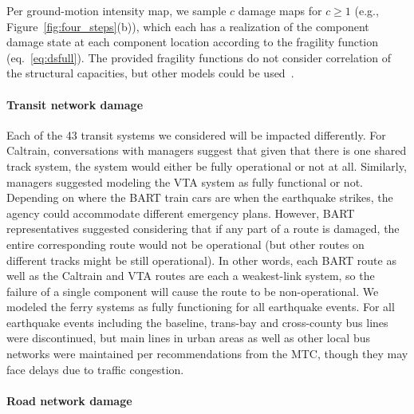 %

Per ground-motion intensity map, we sample $c$ damage maps for $c \geq 1$ (e.g., Figure~\ref{fig:four_steps}{(b)}), which each has a realization of the component damage state at each component location according to the fragility function (eq.~\ref{eq:dsfull}). The provided fragility functions do not consider correlation of the structural capacities, but other models could be used~\cite[e.g.,][]{baker_introducing_2008}.

\paragraph{Transit network damage}
\label{sec:transitDamage}
Each of the 43 transit systems we considered will be impacted differently. For Caltrain, conversations with managers suggest that given that there is one shared track system, the system would either be fully operational or  not at all. Similarly, managers suggested modeling the VTA system as fully functional or not. Depending on where the BART train cars are when the earthquake strikes, the agency could accommodate different emergency plans. However, BART representatives suggested considering that if any part of a route is damaged, the entire corresponding route would not be operational (but other routes on different tracks might be still operational).  In other words, each BART route as well as the Caltrain and VTA routes are each a weakest-link system,  so the failure of a single component  will cause the route to be non-operational. We modeled the ferry systems as fully functioning for all earthquake events. For all earthquake events including the baseline, trans-bay and cross-county bus lines were discontinued, but main lines in urban areas as well as other local bus networks were maintained per recommendations from the MTC, though they may face delays due to traffic congestion. 

\paragraph{Road network damage}

